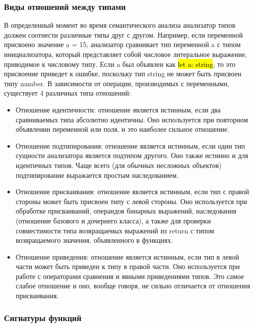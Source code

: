 \subsubsection{Виды отношений между типами}

В определенный момент во время семантического анализа анализатор типов должен соотнести различные типы друг с другом.
Например, если переменной присвоено значение a = 15, анализатор сравнивает тип переменной a с типом
инициализатора, который представляет собой числовое литеральное выражение, приводимое к числовому типу.
Если a был объявлен как \hl{let a: string}, то это присвоение приведет к ошибке, поскольку тип string не может быть
присвоен типу number.
В зависимости от операции, производимых с переменными, существует 4 различных типа отношений:

\begin{itemize}[left=2em]
    \item Отношение идентичности: отношение является истинным, если два сравниваемых типа абсолютно идентичны.
    Оно используется при повторном объявлении переменной или поля, и это наиболее сильное отношение.
    \item Отношение подтипирования: отношение является истинным, если один тип сущности анализатора является подтипом
    другого.
    Оно также истинно и для идентичных типов.
    Чаще всего (для обычных несложных объектов) подтипирование выражается простым наследованием.
    \item Отношение присваивания: отношение является истинным, если тип с правой стороны может быть присвоен типу
    с левой стороны.
    Оно используется при обработке присваиваний, операндов бинарных выражений, наследования (отношение базового и дочернего класса),
    а также для проверки совместимости типа возвращаемых выражений из return с типом возвращаемого значения, объявленного в функциях.
    \item Отношение приведения: отношение является истинным, если тип в левой части может быть приведен к типу в правой части.
    Оно используется при работе с операторами сравнения и явными приведениями типов.
    Это самое слабое отношение и оно, вообще говоря, не сильно отличается от отношения присваивания.
\end{itemize}

\subsubsection{Сигнатуры функций}

